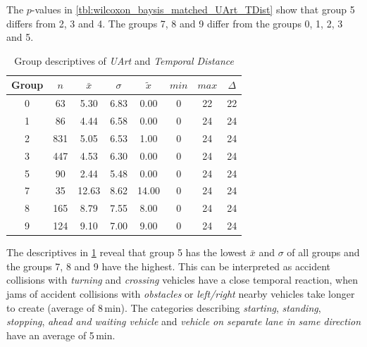 The $p$-values in \cref{tbl:wilcoxon_baysis_matched_UArt_TDist} show that group 5 differs from 2, 3 and 4. The groups 7, 8 and 9 differ from the groups 0, 1, 2, 3 and 5.
\begin{table}[ht!]
	\tiny
	\centering
	\begin{tabular}{c|c|c|c|c|c|c|c}
		\hline
		Group & $n$ & $\bar{x}$ & $\sigma$ & $\tilde{x}$ & $min$ & $max$ & $\Delta$ \\
		\hline
		0 & 63  & 5.30  & 6.83 & 0.00  & 0 & 22 & 22 \\ 
		1 & 86  & 4.44  & 6.58 & 0.00  & 0 & 24 & 24 \\ 
		2 & 831 & 5.05  & 6.53 & 1.00  & 0 & 24 & 24 \\ 
		3 & 447 & 4.53  & 6.30 & 0.00  & 0 & 24 & 24 \\ 
		5 & 90  & 2.44  & 5.48 & 0.00  & 0 & 24 & 24 \\  
		7 & 35  & 12.63 & 8.62 & 14.00 & 0 & 24 & 24 \\ 
		8 & 165 & 8.79  & 7.55 & 8.00  & 0 & 24 & 24 \\ 
		9 & 124 & 9.10  & 7.00 & 9.00  & 0 & 24 & 24 \\ 
		\hline
	\end{tabular}
	\caption{Group descriptives of \textit{UArt} and \textit{Temporal Distance}}
	\label{tbl:descriptives_baysis_matched_UArt_TDist}
\end{table}
The descriptives in \cref{tbl:descriptives_baysis_matched_UArt_TDist} reveal that group 5 has the lowest $\bar{x}$ and $\sigma$ of all groups and the groups 7, 8 and 9 have the highest. This can be interpreted as accident collisions with \textit{turning} and \textit{crossing} vehicles have a close temporal reaction, when jams of accident collisions with \textit{obstacles} or \textit{left/right} nearby vehicles take longer to create (average of 8\,min). The categories describing \textit{starting}, \textit{standing}, \textit{stopping}, \textit{ahead and waiting vehicle} and \textit{vehicle on separate lane in same direction} have an average of 5\,min.

